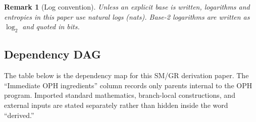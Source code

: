 \documentclass[11pt]{article}
\newtheorem{remark}[theorem]{Remark}
\begin{document}
\begin{remark}[Log convention]
Unless an explicit base is written, logarithms and entropies in this paper use natural logs (nats). Base-2 logarithms are written as \(\log_2\) and quoted in bits.
\end{remark}

\subsection*{Dependency DAG}

The table below is the dependency map for this SM/GR derivation paper. The ``Immediate OPH ingredients'' column records only parents internal to the OPH program. Imported standard mathematics, branch-local constructions, and external inputs are stated separately rather than hidden inside the word ``derived.''
\end{document}
